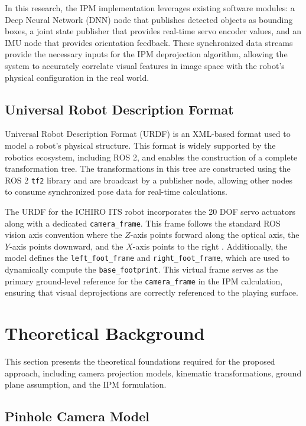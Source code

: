 \documentclass[journal]{IAENGtran}
\begin{document}
In this research, the IPM implementation leverages existing software
modules: a Deep Neural Network (DNN) node that publishes detected objects
as bounding boxes, a joint state publisher that provides real-time servo
encoder values, and an IMU node that provides orientation feedback. These
synchronized data streams provide the necessary inputs for the IPM deprojection
algorithm, allowing the system to accurately correlate visual features in
image space with the robot's physical configuration in the real world.

\subsection{Universal Robot Description Format}

Universal Robot Description Format (URDF) is an XML-based format used to
model a robot's physical structure. This format is widely supported by
the robotics ecosystem, including ROS 2, and enables the construction of a
complete transformation tree. The transformations in this tree are constructed using
the ROS 2 \texttt{tf2} library and are broadcast by a publisher node,
allowing other nodes to consume synchronized pose data for real-time calculations.

The URDF for the ICHIRO ITS robot incorporates the 20 DOF servo actuators
along with a dedicated \texttt{camera\_frame}. This frame follows the
standard ROS vision axis convention where the $Z$-axis points forward
along the optical axis, the $Y$-axis points downward, and the $X$-axis
points to the right \cite{NVIDIA2026}. Additionally, the model
defines the \texttt{left\_foot\_frame} and \texttt{right\_foot\_frame},
which are used to dynamically compute the \texttt{base\_footprint}.
This virtual frame serves as the primary ground-level reference for
the \texttt{camera\_frame} in the IPM calculation, ensuring that visual
deprojections are correctly referenced to the playing surface.

\section{Theoretical Background} \label{sec:theories}

This section presents the theoretical foundations required for the
proposed approach, including camera projection models, kinematic transformations,
ground plane assumption, and the IPM formulation.

\subsection{Pinhole Camera Model}
\end{document}
